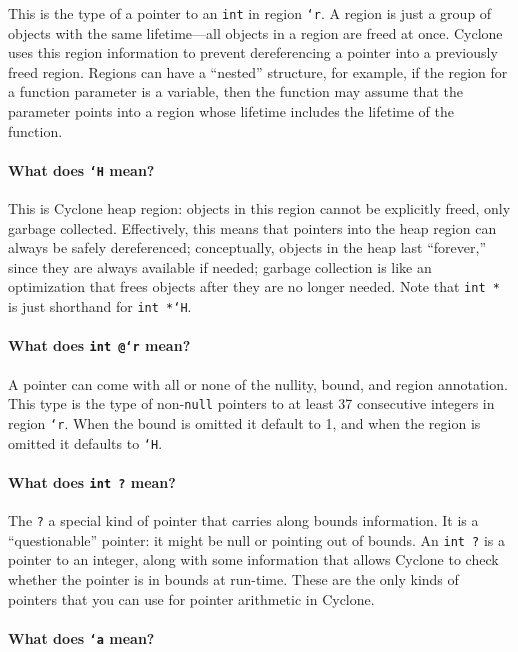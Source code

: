 This is the type of a pointer to an \texttt{int} in region
\texttt{`r}.  A region is just a group of objects with the same
lifetime---all objects in a region are freed at once.  Cyclone uses
this region information to prevent dereferencing a pointer into a
previously freed region.  Regions can have a ``nested'' structure, for
example, if the region for a function parameter is a variable, then
the function may assume that the parameter points into a region whose
lifetime includes the lifetime of the function.

\paragraph{What does \texttt{`H} mean?}

This is Cyclone heap region: objects in this region cannot be
explicitly freed, only garbage collected.  Effectively, this means
that pointers into the heap region can always be safely dereferenced;
conceptually, objects in the heap last ``forever,'' since they are
always available if needed; garbage collection is like an optimization
that frees objects after they are no longer needed.  Note that
\texttt{int *} is just shorthand for \texttt{int *`H}.

\paragraph{What does \texttt{int @\rb `r} mean?}

A pointer can come with all or none of the nullity, bound, and region
annotation.  This type is the type of non-\texttt{null} pointers to
at least 37 consecutive integers in region \texttt{`r}.  When the
bound is omitted it default to 1, and when the region is omitted
it defaults to \texttt{`H}.

\paragraph{What does \texttt{int ?} mean?}

The \texttt{?} a special kind of pointer that carries along bounds
information.  It is a ``questionable'' pointer: it might be null or
pointing out of bounds.  An \texttt{int ?} is a pointer to an integer,
along with some information that allows Cyclone to check whether the
pointer is in bounds at run-time.  These are the only kinds of
pointers that you can use for pointer arithmetic in Cyclone.

\paragraph{What does \texttt{`a} mean?}

